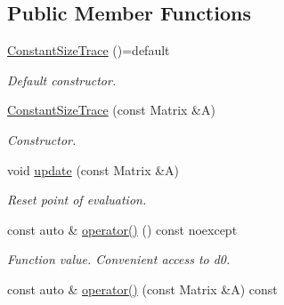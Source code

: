 \subsection*{Public Member Functions}
\begin{DoxyCompactItemize}
\item 
\hypertarget{structRFFGen_1_1LinearAlgebra_1_1ConstantSizeTrace_a54bd89f9dbd5b2aa1845859b265571d4}{\hyperlink{structRFFGen_1_1LinearAlgebra_1_1ConstantSizeTrace_a54bd89f9dbd5b2aa1845859b265571d4}{Constant\-Size\-Trace} ()=default}\label{structRFFGen_1_1LinearAlgebra_1_1ConstantSizeTrace_a54bd89f9dbd5b2aa1845859b265571d4}

\begin{DoxyCompactList}\small\item\em Default constructor. \end{DoxyCompactList}\item 
\hyperlink{structRFFGen_1_1LinearAlgebra_1_1ConstantSizeTrace_a9ed61eb129e946f682dcbb7e5bd0b028}{Constant\-Size\-Trace} (const Matrix \&A)
\begin{DoxyCompactList}\small\item\em Constructor. \end{DoxyCompactList}\item 
\hypertarget{structRFFGen_1_1LinearAlgebra_1_1ConstantSizeTrace_abf6e90e249fbdaf4be00b9c155989ab0}{void \hyperlink{structRFFGen_1_1LinearAlgebra_1_1ConstantSizeTrace_abf6e90e249fbdaf4be00b9c155989ab0}{update} (const Matrix \&A)}\label{structRFFGen_1_1LinearAlgebra_1_1ConstantSizeTrace_abf6e90e249fbdaf4be00b9c155989ab0}

\begin{DoxyCompactList}\small\item\em Reset point of evaluation. \end{DoxyCompactList}\item 
\hypertarget{structRFFGen_1_1LinearAlgebra_1_1ConstantSizeTrace_a932aa99cd77b7f4c53cbebb8982a5056}{const auto \& \hyperlink{structRFFGen_1_1LinearAlgebra_1_1ConstantSizeTrace_a932aa99cd77b7f4c53cbebb8982a5056}{operator()} () const noexcept}\label{structRFFGen_1_1LinearAlgebra_1_1ConstantSizeTrace_a932aa99cd77b7f4c53cbebb8982a5056}

\begin{DoxyCompactList}\small\item\em Function value. Convenient access to d0. \end{DoxyCompactList}\item 
\hypertarget{structRFFGen_1_1LinearAlgebra_1_1ConstantSizeTrace_ac23921eac39533680c9060865728ab5c}{const auto \& \hyperlink{structRFFGen_1_1LinearAlgebra_1_1ConstantSizeTrace_ac23921eac39533680c9060865728ab5c}{operator()} (const Matrix \&A) const }\label{structRFFGen_1_1LinearAlgebra_1_1ConstantSizeTrace_ac23921eac39533680c9060865728ab5c}


\end{DoxyCompactItemize}
